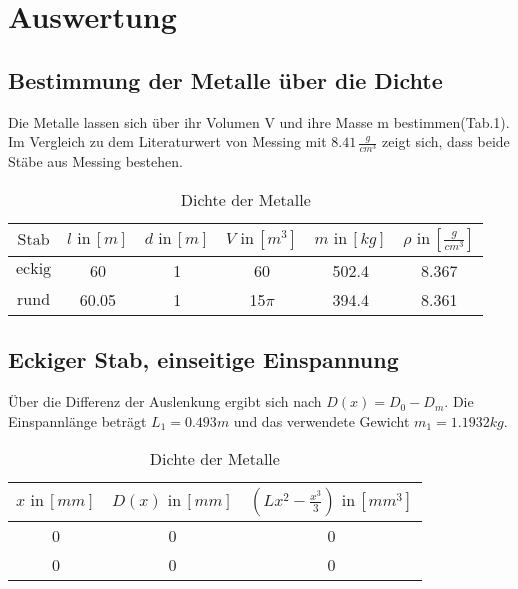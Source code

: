 \section{Auswertung}
\label{sec:Auswertung}



\subsection{Bestimmung der Metalle über die Dichte}
Die Metalle lassen sich über ihr Volumen V und ihre Masse m bestimmen(Tab.1).
Im Vergleich zu dem Literaturwert von Messing mit $8.41\, \frac{g}{cm^3}$\cite{litval}
zeigt sich, dass beide Stäbe aus Messing bestehen.
\begin{table}[h]
  \centering
  \label{tab:lit}
  \begin{tabular}{ c c c c c c }
    \toprule
    {$\text{Stab}$}
   &{$l \,\, \text{in} \, [m]$}
   &{$d \,\, \text{in} \, [m]$}
   &{$V \,\, \text{in} \, [m^3]$}
   &{$m \,\, \text{in} \, [kg]$}
   &{$\rho \,\, \text{in} \, [\frac{g}{cm^3}]$} \\
    \midrule
     {$\text{eckig}$}&60&1&60&502.4 & 8.367 \\
     {$\text{rund}$}&60.05&1&15$\pi$&394.4 & 8.361 \\
    \bottomrule
  \end{tabular}
  \caption{Dichte der Metalle}
\end{table}


\subsection{Eckiger Stab, einseitige Einspannung}

Über die Differenz der Auslenkung  ergibt sich nach
$D(x) = D_0 - D_m$. Die Einspannlänge beträgt $L_1 = 0.493m$ und
das verwendete Gewicht $m_1 = 1.1932 kg$.

\begin{table}[h]
  \centering
  \label{tab:lit2}
  \begin{tabular}{ c c c }
    \toprule
    $x \,\, \text{in} \, [mm]$
   &{$D(x) \,\, \text{in} \, [mm]$}
   &{$(Lx^2- \frac{x^3}{3}) \,\, \text{in} \, [mm^3]$} \\

    \midrule
     0 & 0 & 0 \\
     0 & 0 & 0 \\
    \bottomrule
  \end{tabular}
  \caption{Dichte der Metalle}
\end{table}

